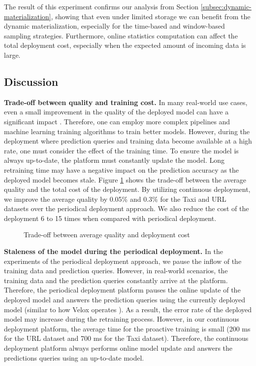 The result of this experiment confirms our analysis from Section \ref{subsec:dynamic-materialization}, showing that even under limited storage we can benefit from the dynamic materialization, especially for the time-based and window-based sampling strategies.
Furthermore, online statistics computation can affect the total deployment cost, especially when the expected amount of incoming data is large.

\subsection{Discussion} \label{subsec:discussion}
\textbf{Trade-off between quality and training cost.}
In many real-world use cases, even a small improvement in the quality of the deployed model can have a significant impact  \cite{ling2017model}.
Therefore, one can employ more complex pipelines and machine learning training algorithms to train better models.
However, during the deployment where prediction queries and training data become available at a high rate, one must consider the effect of the training time.
To ensure the model is always up-to-date, the platform must constantly update the model.
Long retraining time may have a negative impact on the prediction accuracy as the deployed model becomes stale.
Figure \ref{trade-off-figure} shows the trade-off between the average quality and the total cost of the deployment.
By utilizing continuous deployment, we improve the average quality by 0.05\% and 0.3\% for the Taxi and URL datasets over the periodical deployment approach.
We also reduce the cost of the deployment 6 to 15 times when compared with periodical deployment.

\begin{figure}[!h]
\centering
\resizebox{\columnwidth}{!}{}
\caption{Trade-off between average quality and deployment cost}
\label{trade-off-figure}
\end{figure}

\textbf{Staleness of the model during the periodical deployment.}
In the experiments of the periodical deployment approach, we pause the inflow of the training data and prediction queries.
However, in real-world scenarios, the training data and the prediction queries constantly arrive at the platform.
Therefore, the periodical deployment platform pauses the online update of the deployed model and answers the prediction queries using the currently deployed model (similar to how Velox operates \cite{crankshaw2014missing}).
As a result, the error rate of the deployed model may increase during the retraining process.
However, in our continuous deployment platform, the average time for the proactive training is small (200 ms for the URL dataset and 700 ms for the Taxi dataset).
Therefore, the continuous deployment platform always performs online model update and answers the predictions queries using an up-to-date model.